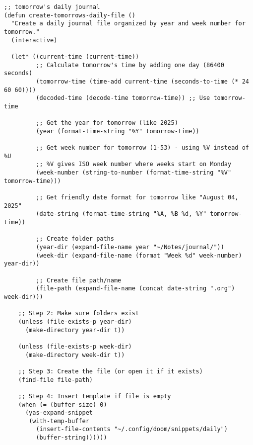 \documentclass[11pt]{article}
\begin{document}
\begin{verbatim}
;; tomorrow's daily journal
(defun create-tomorrows-daily-file ()
  "Create a daily journal file organized by year and week number for tomorrow."
  (interactive)

  (let* ((current-time (current-time))
         ;; Calculate tomorrow's time by adding one day (86400 seconds)
         (tomorrow-time (time-add current-time (seconds-to-time (* 24 60 60))))
         (decoded-time (decode-time tomorrow-time)) ;; Use tomorrow-time

         ;; Get the year for tomorrow (like 2025)
         (year (format-time-string "%Y" tomorrow-time))

         ;; Get week number for tomorrow (1-53) - using %V instead of %U
         ;; %V gives ISO week number where weeks start on Monday
         (week-number (string-to-number (format-time-string "%V" tomorrow-time)))

         ;; Get friendly date format for tomorrow like "August 04, 2025"
         (date-string (format-time-string "%A, %B %d, %Y" tomorrow-time))

         ;; Create folder paths
         (year-dir (expand-file-name year "~/Notes/journal/"))
         (week-dir (expand-file-name (format "Week %d" week-number) year-dir))

         ;; Create file path/name
         (file-path (expand-file-name (concat date-string ".org") week-dir)))

    ;; Step 2: Make sure folders exist
    (unless (file-exists-p year-dir)
      (make-directory year-dir t))

    (unless (file-exists-p week-dir)
      (make-directory week-dir t))

    ;; Step 3: Create the file (or open it if it exists)
    (find-file file-path)

    ;; Step 4: Insert template if file is empty
    (when (= (buffer-size) 0)
      (yas-expand-snippet
       (with-temp-buffer
         (insert-file-contents "~/.config/doom/snippets/daily")
         (buffer-string))))))
\end{verbatim}
\end{document}
